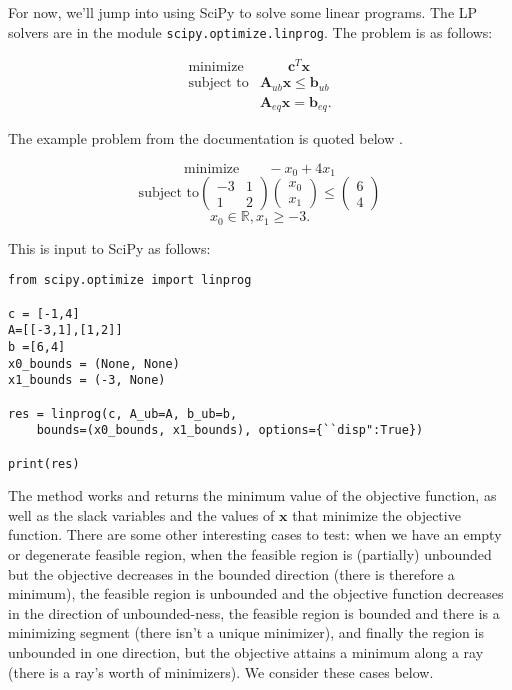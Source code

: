 \documentclass[12pt,english]{article}
\begin{document}
For now, we'll jump into using SciPy to solve some linear programs.   The LP solvers are in the module \texttt{scipy.optimize.linprog}.   The problem is as follows:

$$
\begin{array}{lc}
\text{minimize} & \qquad \mathbf{c}^T \mathbf{x} \\
\text{subject to} 
& \mathbf{A}_{ub} \mathbf{x} \leq \mathbf{b}_{ub}  \\
& \mathbf{A}_{eq} \mathbf{x} = \mathbf{b}_{eq}.
\end{array}
$$

The example problem from the documentation is quoted below \cite{SciPy}.


$$
\text{minimize} \qquad -x_0 + 4x_1
$$
$$
\text{subject to}
\left(
\begin{array}{cc}
-3 & 1 \\
1 & 2 
\end{array}
\right)
\left(
\begin{array}{c}
x_0 \\
x_1
\end{array}
\right)
\leq 
\left(
\begin{array}{c}
6 \\
4
\end{array}
\right)
$$
$$
 x_0 \in \mathbb{R}, x_1 \geq -3.
$$

\noindent This is input to SciPy as follows:

\begin{lstlisting}
from scipy.optimize import linprog

c = [-1,4]
A=[[-3,1],[1,2]]
b =[6,4]
x0_bounds = (None, None)
x1_bounds = (-3, None)

res = linprog(c, A_ub=A, b_ub=b, 
	bounds=(x0_bounds, x1_bounds), options={``disp":True})
	
print(res)

\end{lstlisting}

The method works and returns the minimum value of the objective function, as well as the slack variables and the values of $\mathbf{x}$ that minimize the objective function.  There are some other interesting cases to test: when we have an empty or degenerate feasible region, when the feasible region is (partially) unbounded but the objective decreases in the bounded direction (there is therefore a minimum), the feasible region is unbounded and the objective function decreases in the direction of unbounded-ness, the feasible region is bounded and there is a minimizing segment (there isn't a unique minimizer), and finally the region is unbounded in one direction, but the objective attains a minimum along a ray (there is a ray's worth of minimizers).  We consider these cases below.
\end{document}
